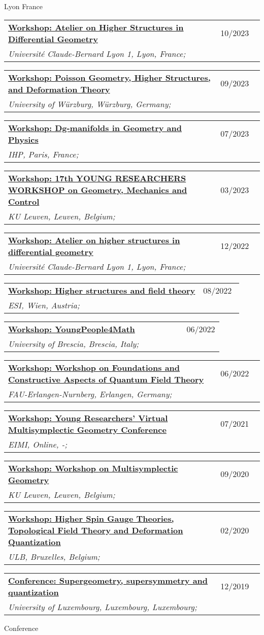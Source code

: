 \documentclass[a4paper]{article}
\newcommand{\longvoice}[8]{
	\begin{tabular}{p{0.83\linewidth} p{0.17\linewidth} }
		\textbf{\href{#3}{#2: #1}} & #4 
		\\ 
		\textit{#5, #6, #7;} & {\small\emph{#8}}
	\end{tabular}
	\vspace{.5em}
}
\begin{document}
		{Lyon}
		{France}
		{}
	\longvoice{Atelier on Higher Structures in Differential Geometry}
		{Workshop}
		{https://ryvkin.eu/hs2023/index.html}
		{10/2023}
		{Université Claude-Bernard Lyon 1}
		{Lyon}
		{France}
		{}
	\longvoice{Poisson Geometry, Higher Structures, and Deformation Theory}
		{Workshop}
		{https://www.mathematik.uni-wuerzburg.de/mathematicalphysics/forschung/veranstaltungen/workshops-und-konferenzen/single/news/poisson-geometry-higher-structures-and-deformation-theory/}
		{09/2023}
		{University of Würzburg}
		{Würzburg}
		{Germany}
		{}
	\longvoice{Dg-manifolds in Geometry and Physics}
		{Workshop}
		{https://indico.math.cnrs.fr/event/7885/}
		{07/2023}
		{IHP}
		{Paris}
		{France}
		{}
	\longvoice{17th YOUNG RESEARCHERS WORKSHOP on Geometry, Mechanics and Control}
		{Workshop}
		{https://wis.kuleuven.be/events/young-researchers-workshop2023/young-researchers-workshop2023}
		{03/2023}
		{KU Leuven}
		{Leuven}
		{Belgium}
		{}
	\longvoice{Atelier on higher structures in differential geometry}
		{Workshop}
		{https://ryvkin.eu/atelier2022/}
		{12/2022}
		{Université Claude-Bernard Lyon 1}
		{Lyon}
		{France}
		{}
	\longvoice{Higher structures and field theory}
		{Workshop}
		{https://www.esi.ac.at/events/e430/}
		{08/2022}
		{ESI}
		{Wien}
		{Austria}
		{}
	\longvoice{YoungPeople4Math}
		{Workshop}
		{https://www.dropbox.com/s/2elzcczx7m0o9zf/2206-Brescia-YoungPeople4Math.pdf?dl=0}
		{06/2022}
		{University of Brescia}
		{Brescia}
		{Italy}
		{}
	\longvoice{Workshop on Foundations and Constructive Aspects of Quantum Field Theory}
		{Workshop}
		{https://en.www.math.fau.de/mathematical-physics/gandalf-lechner/events10056/workshop-lqp46/}
		{06/2022}
		{FAU-Erlangen-Nurnberg}
		{Erlangen}
		{Germany}
		{}
	\longvoice{Young Researchers' Virtual Multisymplectic Geometry Conference}
		{Workshop}
		{https://public.eimi.ru/~cblacker/yrvmgc_21.html}
		{07/2021}
		{EIMI}
		{Online}
		{-}
		{}
	\longvoice{Workshop on Multisymplectic Geometry}
		{Workshop}
		{https://wis.kuleuven.be/events/archive/multisymplectic}
		{09/2020}
		{KU Leuven}
		{Leuven}
		{Belgium}
		{}
	\longvoice{Higher Spin Gauge Theories, Topological Field Theory and Deformation Quantization}
		{Workshop}
		{http://www.solvayinstitutes.be/event/workshop/higher_spin_2020/higher_spin_2020.html}
		{02/2020}
		{ULB}
		{Bruxelles}
		{Belgium}
		{}
	\longvoice{Supergeometry, supersymmetry and quantization}
		{Conference}
		{http://math.uni.lu/SuperWork/SuperConference.html}
		{12/2019}
		{University of Luxembourg}
		{Luxembourg}
		{Luxembourg}
		{}
		{Conference}
\end{document}
